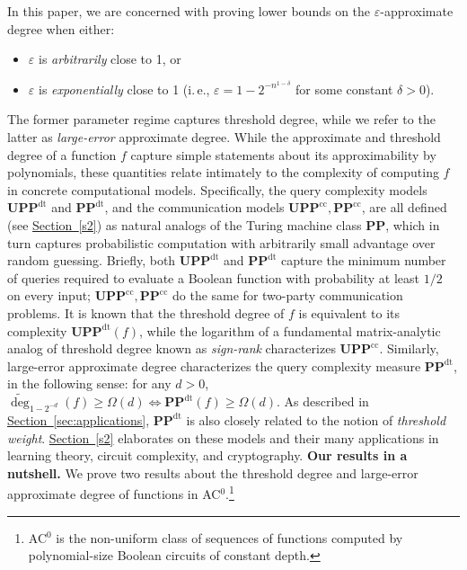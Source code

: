 \documentclass[11pt]{article}
\numberwithin{equation}{section}
\theoremstyle{definition}
\theoremstyle{plain}
\newcommand{\ie}{i.\,e.}
\newcommand{\expref}[2]{\hyperref[#2]{#1~\ref{#2}}}
\newcommand{\PP}{\mathbf{PP}}
\newcommand{\UPP}{\mathbf{UPP}}
\newcommand{\eps}{\varepsilon}
\newcommand{\adeg}{\widetilde{\operatorname{deg}}}
\begin{document}
In this paper, we are concerned with proving %
lower bounds on 
the %
$\eps$-approximate degree  %
 when either:

\begin{itemize}
	\item  $\eps$ is \emph{arbitrarily} close to 1, or
	\item $\eps$ is \emph{exponentially} close to 1 (\ie, $\eps=1-2^{-n^{1-\delta}}$ 
	for some constant $\delta > 0$).
\end{itemize}
The former parameter regime captures threshold degree, while we refer to the latter as  \emph{large-error}
approximate degree.
%
While the approximate and threshold degree of a function $f$ capture simple statements about its approximability by polynomials, these quantities relate intimately to the complexity of computing $f$ in concrete computational models. Specifically, the query complexity models $\UPP^{\text{dt}}$ and $\PP^{\text{dt}}$, and the communication models $\UPP^{\text{cc}}, \PP^{\text{cc}}$, are all defined (see \expref{Section}{s2}) as natural analogs of the Turing machine class $\PP$, which in turn captures probabilistic computation with arbitrarily small advantage over random guessing. Briefly, both $\UPP^{\text{dt}}$ and $\PP^{\text{dt}}$ capture the minimum number of queries required to evaluate a Boolean function with probability at least $1/2$ on every input;  $\UPP^{\text{cc}}, \PP^{\text{cc}}$ do the same for two-party communication problems.
It is known that the threshold degree of $f$ is equivalent to its complexity $\UPP^{\text{dt}}(f)$, while the logarithm of a fundamental matrix-analytic analog of threshold degree known as \emph{sign-rank} characterizes $\UPP^{\text{cc}}$. \label{s1}
Similarly, large-error approximate degree characterizes the query complexity measure $\PP^{\text{dt}}$, in the following 
sense: for any $d > 0$, $\adeg_{1-2^{-d}}(f) \geq \Omega(d) \Longleftrightarrow \PP^{\text{dt}}(f) \geq \Omega(d)$. As described in \expref{Section}{sec:applications}, $\PP^{\text{dt}}$ is also closely related to the notion of \emph{threshold weight}. 
\expref{Section}{s2} elaborates on these models and their many applications in learning theory, circuit complexity, and cryptography.
\medskip \noindent \textbf{Our results in a nutshell.}
We prove two results about the threshold degree and large-error approximate degree
of functions in AC$^0$.\footnote{AC$^0$ is the non-uniform class of sequences of functions computed by polynomial-size %
Boolean circuits of constant depth.} 
\end{document}
